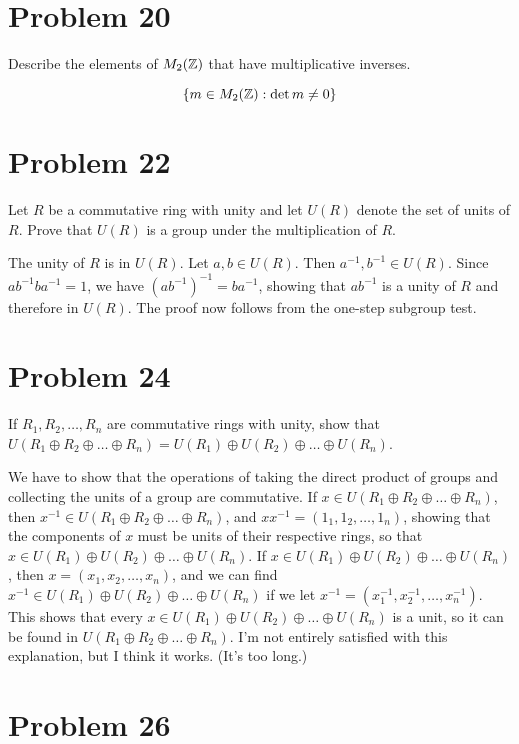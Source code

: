 \documentclass{article}
\begin{document}
\section*{Problem 20}

Describe the elements of $M_2(\mathbb{Z})$ that have multiplicative inverses.

\begin{equation*}
\{m\in M_2(\mathbb{Z}):\det m\neq 0\}
\end{equation*}

\section*{Problem 22}

Let $R$ be a commutative ring with unity and let $U(R)$ denote the set
of units of $R$.
Prove that $U(R)$ is a group under the multiplication of $R$.

The unity of $R$ is in $U(R)$.
Let $a,b\in U(R)$.  Then $a^{-1},b^{-1}\in U(R)$.
Since $ab^{-1}ba^{-1}=1$, we have $(ab^{-1})^{-1}=ba^{-1}$, showing
that $ab^{-1}$ is a unity of $R$ and therefore in $U(R)$.
The proof now follows from the one-step subgroup test.

\section*{Problem 24}

If $R_1,R_2,\dots,R_n$ are commutative rings with unity, show that
$U(R_1\oplus R_2\oplus\dots\oplus R_n)=U(R_1)\oplus U(R_2)\oplus\dots\oplus U(R_n)$.

We have to show that the operations of taking the direct product of groups and
collecting the units of a group are commutative.
If $x\in U(R_1\oplus R_2\oplus\dots\oplus R_n)$, then 
$x^{-1}\in U(R_1\oplus R_2\oplus\dots\oplus R_n)$, and
$xx^{-1}=(1_1,1_2,\dots,1_n)$, showing that the components of $x$ must
be units of their respective rings, so that $x\in U(R_1)\oplus U(R_2)\oplus\dots\oplus U(R_n)$.
If $x\in U(R_1)\oplus U(R_2)\oplus\dots\oplus U(R_n)$, then
$x=(x_1,x_2,\dots,x_n)$, and we can find $x^{-1}\in U(R_1)\oplus U(R_2)\oplus\dots\oplus U(R_n)$
if we let $x^{-1}=(x_1^{-1},x_2^{-1},\dots,x_n^{-1})$.
This shows that every $x\in U(R_1)\oplus U(R_2)\oplus\dots\oplus U(R_n)$ is
a unit, so it can be found in $U(R_1\oplus R_2\oplus\dots\oplus R_n)$.
I'm not entirely satisfied with this explanation, but I think it works.
(It's too long.)

\section*{Problem 26}
\end{document}
